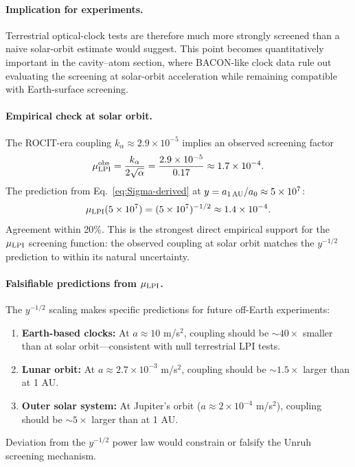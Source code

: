 \paragraph{Implication for experiments.}
Terrestrial optical-clock tests are therefore much more strongly screened than a naive solar-orbit estimate would suggest.  This point becomes quantitatively important in the cavity--atom section, where BACON-like clock data rule out evaluating the screening at solar-orbit acceleration while remaining compatible with Earth-surface screening.

\paragraph{Empirical check at solar orbit.}
The ROCIT-era coupling $k_\alpha \approx 2.9 \times 10^{-5}$ implies an observed screening factor
\begin{equation}
\mu_{\rm LPI}^{\rm obs} = \frac{k_\alpha}{2\sqrt{\alpha}} = \frac{2.9 \times 10^{-5}}{0.17} \approx 1.7 \times 10^{-4}.
\end{equation}
The prediction from Eq.~\eqref{eq:Sigma-derived} at $y = a_{\rm 1\,AU}/a_0 \approx 5 \times 10^7$:
\begin{equation}
\mu_{\rm LPI}(5 \times 10^7) = (5 \times 10^7)^{-1/2} \approx 1.4 \times 10^{-4}.
\end{equation}
Agreement within 20\%.  This is the strongest direct empirical support for the $\mu_{\rm LPI}$ screening function: the observed coupling at solar orbit matches the $y^{-1/2}$ prediction to within its natural uncertainty.

\paragraph{Falsifiable predictions from $\mu_{\rm LPI}$.}
The $y^{-1/2}$ scaling makes specific predictions for future off-Earth experiments:
\begin{enumerate}
\item \textbf{Earth-based clocks:} At $a \approx 10$ m/s$^2$, coupling should be ${\sim}40\times$ smaller than at solar orbit---consistent with null terrestrial LPI tests.
\item \textbf{Lunar orbit:} At $a \approx 2.7 \times 10^{-3}$ m/s$^2$, coupling should be ${\sim}1.5\times$ larger than at 1 AU.
\item \textbf{Outer solar system:} At Jupiter's orbit ($a \approx 2 \times 10^{-4}$ m/s$^2$), coupling should be ${\sim}5\times$ larger than at 1 AU.
\end{enumerate}
Deviation from the $y^{-1/2}$ power law would constrain or falsify the Unruh screening mechanism.

